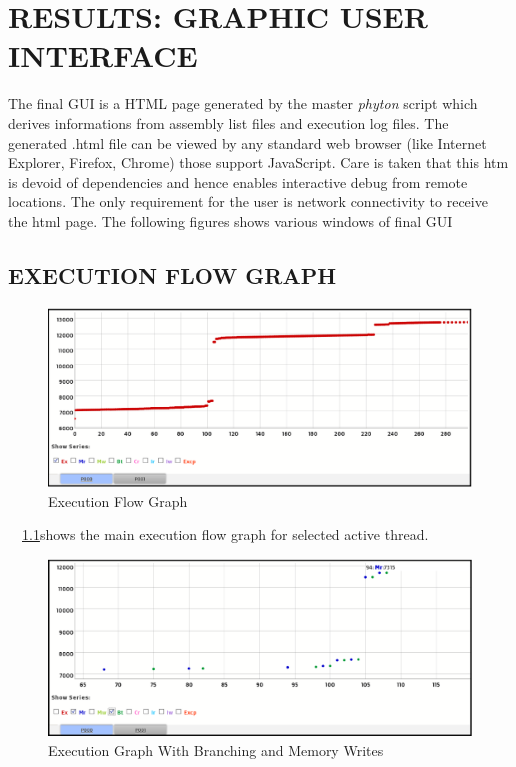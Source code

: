 \chapter{RESULTS: GRAPHIC USER INTERFACE}
\label{chap:GUI_results.tex}
The final GUI is a HTML page generated by the master {\it phyton} script which derives informations from assembly list files and execution log files. The generated .html file can be viewed by any standard web browser (like Internet Explorer, Firefox, Chrome) those support JavaScript. Care is taken that this htm is devoid of dependencies and hence enables interactive debug from remote locations. The only requirement for the user is network connectivity to receive the html page. The following figures shows various windows of final GUI
\section {EXECUTION FLOW GRAPH}
\begin{figure}[H]
\centering
\includegraphics[width=6in]{./figures/gui_graph1.eps}
\caption{Execution Flow Graph}
\label{fig:gui_graph1.eps}
\end{figure}

~\figurename{~\ref{fig:gui_graph1.eps}}shows the main execution flow graph for selected active thread.  
\begin{figure}[H]
\centering
\includegraphics[width=6in]{./figures/gui_graph2.eps}
\caption{Execution Graph With Branching and Memory Writes}
\label{fig:gui_graph2.eps}
\end{figure}

